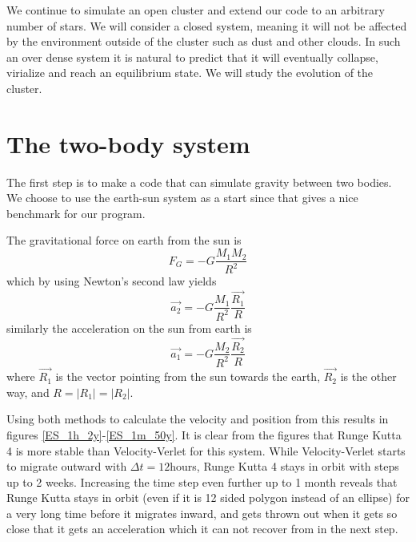 \documentclass{aa}   %
\begin{document}
We continue to simulate an open cluster and extend our code to an arbitrary number of stars. We will consider a closed system, meaning it will not be affected by the environment outside of the cluster such as dust and other clouds. In such an over dense system it is natural to predict that it will eventually collapse, virialize and reach an equilibrium state. We will study the evolution of the cluster.
\section{The two-body system}    \label{sec:twobody}
The first step is to make a code that can simulate gravity between two bodies.
We choose to use the earth-sun system as a start since that gives a nice benchmark for our program.

The gravitational force on earth from the sun is 
\begin{equation}
 F_G = -G \frac{M_1 M_2}{R^2}
\end{equation}
which by using Newton's second law yields
\begin{equation}
 \overrightarrow{a_2} = -G \frac{M_1}{R^2}\frac{\overrightarrow{R_1}}{R}
\end{equation}
similarly the acceleration on the sun from earth is 
\begin{equation}
 \overrightarrow{a_1} = -G \frac{M_2}{R^2}\frac{\overrightarrow{R_2}}{R}
\end{equation}
where $\overrightarrow{R_1}$ is the vector pointing from the sun towards the earth, $\overrightarrow{R_2}$ is the other way, and $R = |R_1|=|R_2|$. 

Using both methods to calculate the velocity and position from this results in figures \ref{ES_1h_2y}-\ref{ES_1m_50y}. It is clear from the figures that Runge Kutta 4 is more stable than Velocity-Verlet for this system. While Velocity-Verlet starts to migrate outward with $\Delta t = 12$hours, Runge Kutta 4 stays in orbit with steps up to 2 weeks. Increasing the time step even further up to 1 month reveals that Runge Kutta stays in orbit (even if it is 12 sided polygon instead of an ellipse) for a very long time before it migrates inward, and gets thrown out when it gets so close that it gets an acceleration which it can not recover from in the next step.
\end{document}
